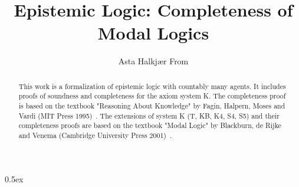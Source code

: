 \documentclass[11pt,a4paper]{article}
\begin{document}
\title{Epistemic Logic: Completeness of Modal Logics}
\author{Asta Halkjær From}
\maketitle

\begin{abstract}
  This work is a formalization of epistemic logic with countably many agents.
  It includes proofs of soundness and completeness for the axiom system K.
  The completeness proof is based on the textbook "Reasoning About Knowledge"
  by Fagin, Halpern, Moses and Vardi (MIT Press 1995)~\cite{fagin1995}.
  The extensions of system K (T, KB, K4, S4, S5) and their completeness proofs
  are based on the textbook "Modal Logic" by Blackburn, de Rijke and Venema
  (Cambridge University Press 2001)~\cite{blackburn2001}.
\end{abstract}

\tableofcontents
\newpage

\parindent 0pt\parskip 0.5ex





\end{document}
